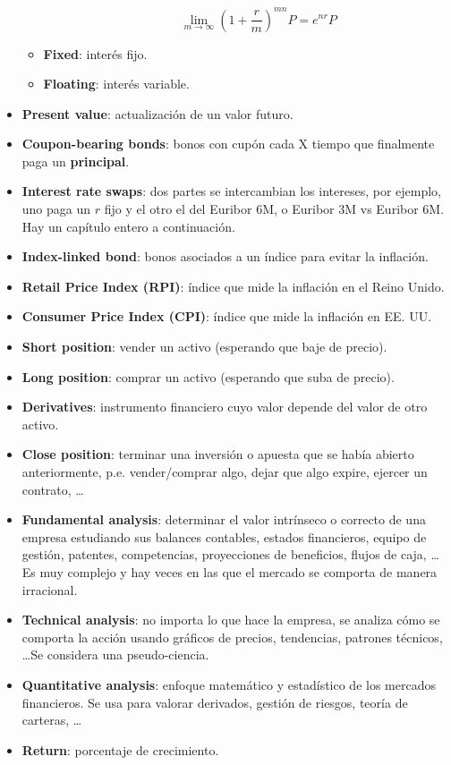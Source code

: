 \begin{itemize}
\begin{itemize}
\begin{itemize}
            $$\lim_{m\rightarrow\infty}\left(1+\frac{r}{m}\right)^{mn}P=e^{nr}P$$
        \end{itemize}
        \item \textbf{Fixed}: interés fijo.
        \item \textbf{Floating}: interés variable.
    \end{itemize}
    \item \textbf{Present value}: actualización de un valor futuro. 
    \item \textbf{Coupon-bearing bonds}: bonos con cupón cada X tiempo que finalmente paga un \textbf{principal}.
    \item \textbf{Interest rate swaps}: dos partes se intercambian los intereses, por ejemplo, uno paga un $r$ fijo y el otro el del Euribor 6M, o Euribor 3M vs Euribor 6M. Hay un capítulo entero a continuación.
    \item \textbf{Index-linked bond}: bonos asociados a un índice para evitar la inflación.
    \item \textbf{Retail Price Index (RPI)}: índice que mide la inflación en el Reino Unido.
    \item \textbf{Consumer Price Index (CPI)}: índice que mide la inflación en EE. UU.
    \item \textbf{Short position}: vender un activo (esperando que baje de precio).
    \item \textbf{Long position}: comprar un activo (esperando que suba de precio).
    \item \textbf{Derivatives}: instrumento financiero cuyo valor depende del valor de otro activo.
    \item \textbf{Close position}: terminar una inversión o apuesta que se había abierto anteriormente, p.e. vender/comprar algo, dejar que algo expire, ejercer un contrato, \dots
    \item \textbf{Fundamental analysis}: determinar el valor intrínseco o correcto de una empresa estudiando sus balances contables, estados financieros, equipo de gestión, patentes, competencias, proyecciones de beneficios, flujos de caja, \dots Es muy complejo y hay veces en las que el mercado se comporta de manera irracional.
    \item \textbf{Technical analysis}: no importa lo que hace la empresa, se analiza cómo se comporta la acción usando gráficos de precios, tendencias, patrones técnicos, \dots Se considera una pseudo-ciencia.
    \item \textbf{Quantitative analysis}: enfoque matemático y estadístico de los mercados financieros. Se usa para valorar derivados, gestión de riesgos, teoría de carteras, \dots
    \item \textbf{Return}: porcentaje de crecimiento.
\end{itemize}


